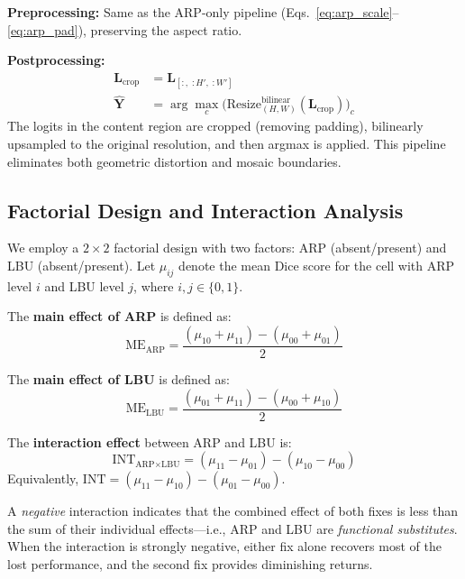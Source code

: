 \documentclass[10pt,twocolumn]{article}
\begin{document}
\textbf{Preprocessing:}
Same as the ARP-only pipeline (Eqs.~\ref{eq:arp_scale}--\ref{eq:arp_pad}), preserving the aspect ratio.

\textbf{Postprocessing:}
\begin{align}
    \mathbf{L}_{\text{crop}} &= \mathbf{L}_{[:,\; :H',\; :W']} \\
    \hat{\mathbf{Y}} &= \arg\max_c \Big(\text{Resize}_{(H,W)}^{\text{bilinear}}(\mathbf{L}_{\text{crop}})\Big)_c
\end{align}
The logits in the content region are cropped (removing padding), bilinearly upsampled to the original resolution, and then argmax is applied. This pipeline eliminates both geometric distortion and mosaic boundaries.

\subsection{Factorial Design and Interaction Analysis}
\label{sec:factorial}

We employ a $2\times2$ factorial design with two factors: ARP (absent/present) and LBU (absent/present).
Let $\mu_{ij}$ denote the mean Dice score for the cell with ARP level $i$ and LBU level $j$, where $i,j \in \{0,1\}$.

The \textbf{main effect of ARP} is defined as:
\begin{equation}
    \text{ME}_{\text{ARP}} = \frac{(\mu_{10} + \mu_{11}) - (\mu_{00} + \mu_{01})}{2}
\end{equation}

The \textbf{main effect of LBU} is defined as:
\begin{equation}
    \text{ME}_{\text{LBU}} = \frac{(\mu_{01} + \mu_{11}) - (\mu_{00} + \mu_{10})}{2}
\end{equation}

The \textbf{interaction effect} between ARP and LBU is:
\begin{equation}
    \text{INT}_{\text{ARP}\times\text{LBU}} = (\mu_{11} - \mu_{01}) - (\mu_{10} - \mu_{00})
    \label{eq:interaction}
\end{equation}
Equivalently, $\text{INT} = (\mu_{11} - \mu_{10}) - (\mu_{01} - \mu_{00})$.

A \textit{negative} interaction indicates that the combined effect of both fixes is less than the sum of their individual effects---i.e., ARP and LBU are \emph{functional substitutes}.
When the interaction is strongly negative, either fix alone recovers most of the lost performance, and the second fix provides diminishing returns.
\end{document}
